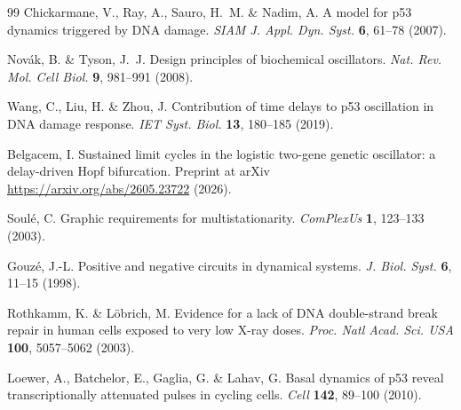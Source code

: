 \documentclass[11pt,a4paper]{article}
\begin{document}
\begin{thebibliography}{99}
Chickarmane, V., Ray, A., Sauro, H.~M. \& Nadim, A. A model for p53 dynamics triggered by DNA damage. \emph{SIAM J. Appl. Dyn. Syst.} \textbf{6}, 61--78 (2007).

Nov\'ak, B. \& Tyson, J.~J. Design principles of biochemical oscillators. \emph{Nat. Rev. Mol. Cell Biol.} \textbf{9}, 981--991 (2008).

Wang, C., Liu, H. \& Zhou, J. Contribution of time delays to p53 oscillation in DNA damage response. \emph{IET Syst. Biol.} \textbf{13}, 180--185 (2019).

Belgacem, I. Sustained limit cycles in the logistic two-gene genetic oscillator: a delay-driven Hopf bifurcation. Preprint at arXiv \url{https://arxiv.org/abs/2605.23722} (2026).

Soul\'e, C. Graphic requirements for multistationarity. \emph{ComPlexUs} \textbf{1}, 123--133 (2003).

Gouz\'e, J.-L. Positive and negative circuits in dynamical systems. \emph{J. Biol. Syst.} \textbf{6}, 11--15 (1998).

Rothkamm, K. \& L\"obrich, M. Evidence for a lack of DNA double-strand break repair in human cells exposed to very low X-ray doses. \emph{Proc. Natl Acad. Sci. USA} \textbf{100}, 5057--5062 (2003).

Loewer, A., Batchelor, E., Gaglia, G. \& Lahav, G. Basal dynamics of p53 reveal transcriptionally attenuated pulses in cycling cells. \emph{Cell} \textbf{142}, 89--100 (2010).

\end{thebibliography}
\end{document}
